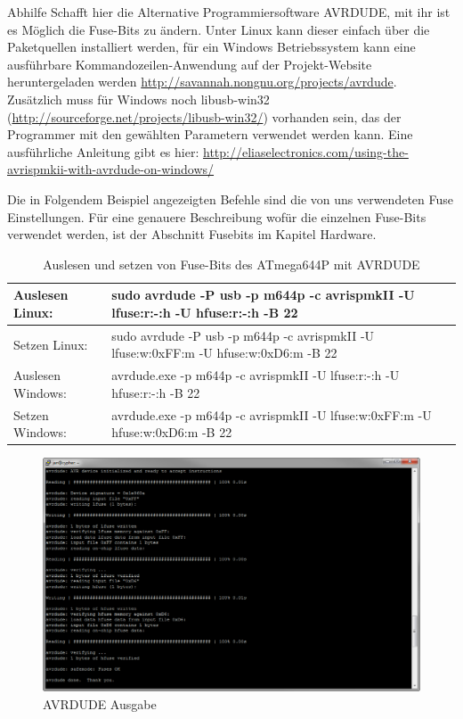 Abhilfe Schafft hier die Alternative Programmiersoftware AVRDUDE, mit ihr ist
es Möglich die Fuse-Bits zu ändern. Unter Linux kann dieser einfach über die
Paketquellen installiert werden, für ein Windows Betriebssystem kann eine
ausführbare Kommandozeilen-Anwendung auf der Projekt-Website heruntergeladen
werden \url{http://savannah.nongnu.org/projects/avrdude}. Zusätzlich muss für
Windows noch libusb-win32 (\url{http://sourceforge.net/projects/libusb-win32/})
vorhanden sein, das der Programmer mit den gewählten Parametern verwendet werden
kann. Eine ausführliche Anleitung gibt es hier:
\url{http://eliaselectronics.com/using-the-avrispmkii-with-avrdude-on-windows/}

Die in Folgendem Beispiel angezeigten Befehle sind die von uns verwendeten Fuse
Einstellungen. Für eine genauere Beschreibung wofür die einzelnen Fuse-Bits
verwendet werden, ist der Abschnitt Fusebits im Kapitel Hardware.

\begin{table}[H]
\begin{tabular}{| p{} | p{} |}
\hline
Auslesen Linux:& sudo avrdude -P usb -p m644p -c avrispmkII  -U lfuse:r:-:h -U hfuse:r:-:h -B 22 \\ \hline
Setzen Linux:& sudo avrdude -P usb -p m644p -c avrispmkII -U lfuse:w:0xFF:m -U hfuse:w:0xD6:m -B 22 \\ \hline
Auslesen Windows:& avrdude.exe -p m644p -c avrispmkII -U lfuse:r:-:h -U hfuse:r:-:h -B 22 \\ \hline 
Setzen Windows:& avrdude.exe -p m644p -c avrispmkII -U lfuse:w:0xFF:m -U hfuse:w:0xD6:m -B 22 \\ \hline
\end{tabular}
\caption{Auslesen und setzen von Fuse-Bits des ATmega644P mit AVRDUDE}
\label{tablelabel}
\end{table}

\begin{figure}[h]
\centering
\includegraphics[width=13cm]{content/pictures/Anleitung/neuerProzessor/avrOutput.png}
\caption{AVRDUDE Ausgabe}
\end{figure}

